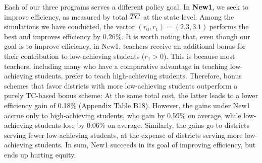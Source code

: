 \documentclass[notitlepage,12pt]{article}%
\begin{document}
Each of our three programs serves a different policy goal. In \textbf{New1},
we seek to improve efficiency, as measured by total $\overline{{\small TC}}$
at the state level. Among the simulations we have conducted, the vector
$(r_{0},r_{1})=\left(  2.3,3.1\right)  \ $performs the best and improves
efficiency by 0.26\%. It is worth noting that, even though our goal is to
improve efficiency, in New1, teachers receive an additional bonus for their
contribution to low-achieving students ($r_{1}>0$). This is because most
teachers, including many who have a comparative advantage in teaching
low-achieving students, prefer to teach high-achieving students. Therefore,
bonus schemes that favor districts with more low-achieving students outperform
a purely TC-based bonus scheme: At the same total cost, the latter leads to a
lower efficiency gain of 0.18\% (Appendix Table B18). However, the
gains under New1 accrue only to high-achieving students, who gain by 0.59\% on
average, while low-achieving students lose by 0.06\% on average. Similarly,
the gains go to districts serving fewer low-achieving students, at the expense
of districts serving more low-achieving students. In sum, New1 succeeds in its
goal of improving efficiency, but ends up hurting equity.
\end{document}
